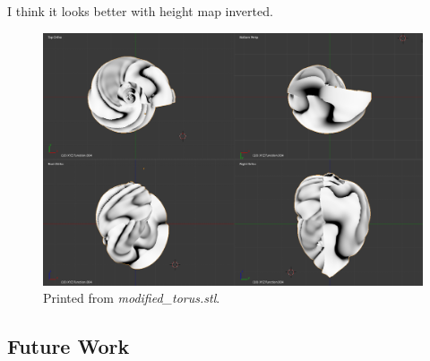 \documentclass[a4paper]{article}
\begin{document}
I think it looks better with height map inverted.

\begin{figure}[h]
	\centering\includegraphics[scale=1.0]{./img/hexaplex_quad_inverted.png}
	\caption{Printed from \textit{modified\_torus.stl}.}
	\label{3d-printed-torus} %
\end{figure}

\subsection{Future Work}





\end{document}
